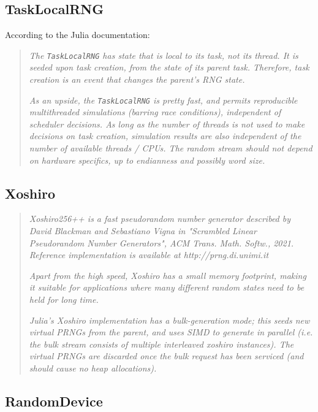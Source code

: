 \documentclass{article}
\begin{document}
        \subsection*{TaskLocalRNG}

        According to the Julia documentation\cite*{Julia-2017}:

            \begin{quote}
                \textit{The \texttt{TaskLocalRNG} has state that is local to its task, not its thread. It is seeded upon task creation, from the state of its parent task. Therefore, task creation is an event that changes the parent's RNG state.}

                \textit{As an upside, the \texttt{TaskLocalRNG} is pretty fast, and permits reproducible multithreaded simulations (barring race conditions), independent of scheduler decisions. As long as the number of threads is not used to make decisions on task creation, simulation results are also independent of the number of available threads / CPUs. The random stream should not depend on hardware specifics, up to endianness and possibly word size.}
            \end{quote}

        \subsection*{Xoshiro}

            \begin{quote}
                \textit{Xoshiro256++ is a fast pseudorandom number generator described by David Blackman and Sebastiano Vigna in "Scrambled Linear Pseudorandom Number Generators", ACM Trans. Math. Softw., 2021. Reference implementation is available at http://prng.di.unimi.it}

                \textit{Apart from the high speed, Xoshiro has a small memory footprint, making it suitable for applications where many different random states need to be held for long time.}

                \textit{Julia's Xoshiro implementation has a bulk-generation mode; this seeds new virtual PRNGs from the parent, and uses SIMD to generate in parallel (i.e. the bulk stream consists of multiple interleaved xoshiro instances). The virtual PRNGs are discarded once the bulk request has been serviced (and should cause no heap allocations).}
            \end{quote}

        \subsection*{RandomDevice}
        
\end{document}
